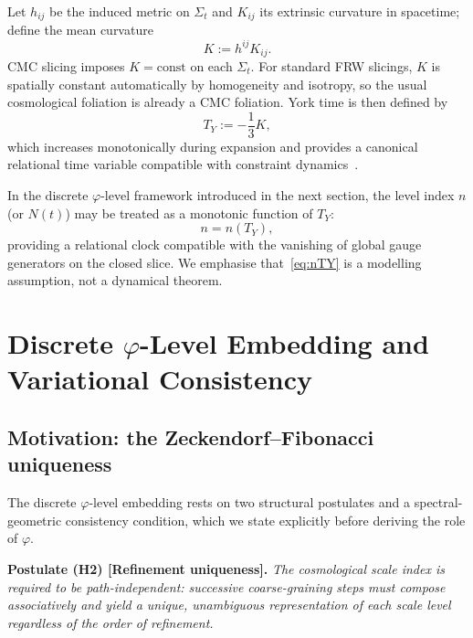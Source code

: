 \documentclass[12pt,a4paper]{article}
\newcommand{\Sig}{\Sigma}           %
\newcommand{\TY}{T_Y}
\newcommand{\NN}{N}          %
\begin{document}
Let $h_{ij}$ be the induced metric on $\Sig_t$ and $K_{ij}$
its extrinsic curvature in spacetime; define the mean
curvature
\begin{equation}
  K := h^{ij}K_{ij}.
  \label{eq:K}
\end{equation}
CMC slicing imposes $K = \text{const}$ on each $\Sig_t$.
For standard FRW slicings, $K$ is spatially constant
automatically by homogeneity and isotropy, so the usual
cosmological foliation is already a CMC foliation. York
time is then defined by
\begin{equation}
  \TY := -\frac{1}{3}K,
  \label{eq:Tyork}
\end{equation}
which increases monotonically during expansion and provides
a canonical relational time variable compatible with
constraint dynamics~\cite{RoserValentini2014}.

In the discrete $\varphi$-level framework introduced in the
next section, the level index $n$ (or $\NN(t)$) may be
treated as a monotonic function of $\TY$:
\begin{equation}
  n = n(\TY),
  \label{eq:nTY}
\end{equation}
providing a relational clock compatible with the vanishing
of global gauge generators on the closed slice. We emphasise
that~\eqref{eq:nTY} is a modelling assumption, not a
dynamical theorem.

\section{Discrete $\varphi$-Level Embedding and
         Variational Consistency}
\label{sec:phi}

\subsection{Motivation: the Zeckendorf--Fibonacci uniqueness}

The discrete $\varphi$-level embedding rests on two
structural postulates and a spectral-geometric consistency
condition, which we state explicitly before deriving the
role of $\varphi$.

\medskip
\noindent\textbf{Postulate (H2) [Refinement uniqueness].}
\textit{The cosmological scale index is required to be
path-independent: successive coarse-graining steps must
compose associatively and yield a unique, unambiguous
representation of each scale level regardless of the order
of refinement.}
\end{document}
